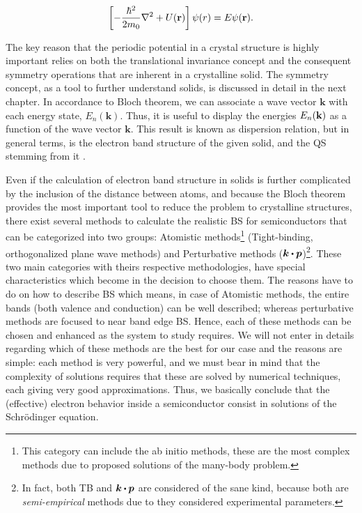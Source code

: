 \begin{equation}
	\left[-\dfrac{\hbar^2}{2m_{0}}\nabla^2 + U(\displaystyle\mathrm{\bf r})\right]\psi (r)=E\psi(\displaystyle\mathrm{\bf r}).
	\label{eq:chapter-1-first-sch}
\end{equation}

The key reason that the periodic potential in a crystal structure is highly important relies on both the translational invariance concept and the consequent symmetry operations that are inherent in a crystalline solid. The symmetry concept, as a tool to further understand solids, is discussed in detail in the next chapter. In accordance to Bloch theorem, we can associate a wave vector $\boldsymbol{k}$ with each energy state, $E_{n}(\boldsymbol{k})$. Thus, it is useful to display the energies $E_{n}(\bf{k})$ as a function of the wave vector $\boldsymbol{k}$. This result is known as dispersion relation, but in general terms, is the electron band structure of the given solid, and the \gls{QS} stemming from it \cite{piprek2017handbook}.   

Even if the calculation of electron band structure in solids is further complicated by the inclusion of the distance between atoms, and because the Bloch theorem provides the most important tool to reduce the problem to crystalline structures, there exist several methods to calculate the realistic \gls{BS} for semiconductors that can be categorized into two groups: Atomistic methods\footnote{This category can include the ab initio methods, these are the most complex methods due to proposed solutions of the many-body problem.} (Tight-binding, orthogonalized plane wave methods) and Perturbative methods ($\boldsymbol{k}\bigcdot \boldsymbol{p}$)\footnote{In fact, both TB and $\boldsymbol{k}\bigcdot \boldsymbol{p}$ are considered of the sane kind, because both are \emph{semi-empirical} methods due to they considered experimental parameters.}. 
These two main categories with theirs respective methodologies, have special characteristics which become in the decision to choose them. The reasons have to do on how to describe \gls{BS} which means, in case of Atomistic methods, the entire bands  (both valence and conduction) can be well described; whereas  perturbative methods are focused to near band edge \gls{BS}. Hence, each of these methods can be chosen and enhanced as the system to study requires. 
We will not enter in details regarding  which of these methods are the best for our case and the reasons are simple: each method is very powerful, and we must bear in mind that the complexity of solutions requires that these are solved by numerical techniques, each giving very good approximations. 
Thus, we basically conclude that the (effective) electron behavior inside a semiconductor consist in solutions of the Schrödinger equation\cite{boer2018semiconductor}.  
